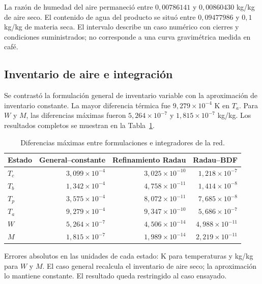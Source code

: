 La razón de humedad del aire permaneció entre $0{,}00786141$ y $0{,}00860430$ kg/kg de aire seco. El contenido de agua del producto se situó entre $0{,}09477986$ y $0{,}1$ kg/kg de materia seca. El intervalo describe un caso numérico con cierres y condiciones suministrados; no corresponde a una curva gravimétrica medida en café.

\subsection{Inventario de aire e integración}

Se contrastó la formulación general de inventario variable con la aproximación de inventario constante. La mayor diferencia térmica fue $9{,}279\times10^{-4}$ K en $T_a$. Para $W$ y $M$, las diferencias máximas fueron $5{,}264\times10^{-7}$ y $1{,}815\times10^{-7}$ kg/kg. Los resultados completos se muestran en la Tabla~\ref{tab:res_red_comparacion}.

\begin{table}[htbp]
\centering
\caption{Diferencias máximas entre formulaciones e integradores de la red.}
\label{tab:res_red_comparacion}
\small
\setlength{\tabcolsep}{5pt}
\begin{tabular}{lrrr}
\toprule
Estado & General--constante & Refinamiento Radau & Radau--BDF \\
\midrule
$T_c$ & $3{,}099\times10^{-4}$ & $3{,}025\times10^{-10}$ & $1{,}218\times10^{-7}$ \\
$T_b$ & $1{,}342\times10^{-4}$ & $4{,}758\times10^{-11}$ & $1{,}414\times10^{-8}$ \\
$T_p$ & $3{,}575\times10^{-4}$ & $8{,}072\times10^{-11}$ & $7{,}685\times10^{-8}$ \\
$T_a$ & $9{,}279\times10^{-4}$ & $9{,}347\times10^{-10}$ & $5{,}686\times10^{-7}$ \\
$W$ & $5{,}264\times10^{-7}$ & $4{,}506\times10^{-14}$ & $4{,}988\times10^{-11}$ \\
$M$ & $1{,}815\times10^{-7}$ & $1{,}989\times10^{-14}$ & $2{,}219\times10^{-11}$ \\
\bottomrule
\end{tabular}
\par\vspace{3pt}
\begin{minipage}{0.98\textwidth}\footnotesize
Errores absolutos en las unidades de cada estado: K para temperaturas y kg/kg para $W$ y $M$. El caso general recalcula el inventario de aire seco; la aproximación lo mantiene constante. El resultado queda restringido al caso ensayado.
\end{minipage}
\end{table}


